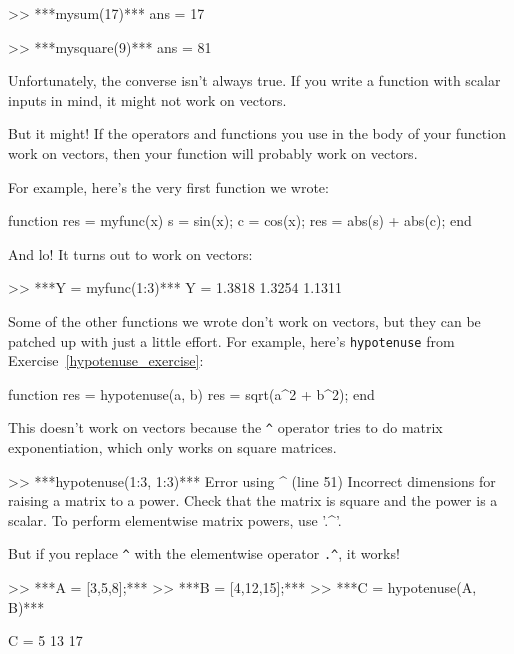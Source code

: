 
\begin{code}
>> ***mysum(17)***
ans = 17

>> ***mysquare(9)***
ans = 81
\end{code}

Unfortunately, the converse isn't always true.  If you write
a function with scalar inputs in mind, it might not work on vectors.

But it might!  If the operators and functions
you use in the body of your function work on vectors, then your
function will probably work on vectors.

For example, here's the very first function we wrote:

\begin{code}
function res = myfunc(x)
    s = sin(x);
    c = cos(x);
    res = abs(s) + abs(c);
end
\end{code}

And lo!  It turns out to work on vectors:

\begin{code}
>> ***Y = myfunc(1:3)***
Y = 1.3818    1.3254    1.1311
\end{code}

Some of the other functions we wrote don't work on vectors,
but they can be patched up with just a little effort.  For example,
here's {\tt hypotenuse} from Exercise~\ref{hypotenuse_exercise}:

\begin{code}
function res = hypotenuse(a, b)
    res = sqrt(a^2 + b^2);
end
\end{code}

This doesn't work on vectors because the \verb+^+ operator
tries to do matrix exponentiation, which only works on
square matrices.


\begin{code}
>> ***hypotenuse(1:3, 1:3)***
Error using  ^  (line 51)
Incorrect dimensions for raising a matrix to a power. 
Check that the matrix is square and the power is a scalar. 
To perform elementwise matrix powers, use '.^'.
\end{code}

But if you replace \verb+^+ with the elementwise operator
\verb+.^+, it works!


\begin{code}
>> ***A = [3,5,8];***
>> ***B = [4,12,15];***
>> ***C = hypotenuse(A, B)***

C = 5    13    17
\end{code}

